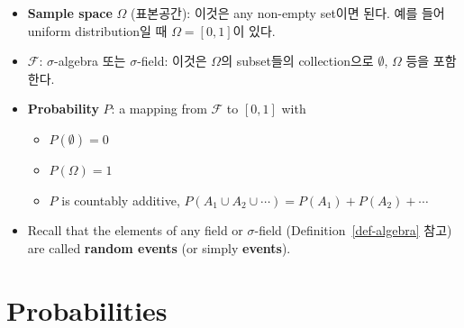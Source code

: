 \documentclass[
  13pt,
  letterpaper,
  DIV=11,
  numbers=noendperiod]{scrreprt}
\providecommand{\tightlist}{%
  \setlength{\itemsep}{0pt}\setlength{\parskip}{0pt}}\usepackage{longtable,booktabs,array}
\theoremstyle{plain}
\theoremstyle{definition}
\theoremstyle{definition}
\theoremstyle{plain}
\theoremstyle{definition}
\theoremstyle{plain}
\theoremstyle{remark}
\begin{document}
\begin{itemize}
\item
  \textbf{Sample space} \(\Omega\) (표본공간): 이것은 any non-empty
  set이면 된다. 예를 들어 uniform distribution일 때 \(\Omega = [0,1]\)이
  있다.
\item
  \(\mathcal{F}\): \(\sigma\)-algebra 또는 \(\sigma\)-field: 이것은
  \(\Omega\)의 subset들의 collection으로 \(\emptyset\), \(\Omega\) 등을
  포함한다.
\item
  \textbf{Probability} \(P\): a mapping from \(\mathcal{F}\) to
  \([0,1]\) with

  \begin{itemize}
  \tightlist
  \item
    \(P(\emptyset)=0\)
  \item
    \(P(\Omega)=1\)
  \item
    \(P\) is countably additive,
    \(P(A_1 \cup A_2 \cup \cdots) = P(A_1) + P(A_2) + \cdots\)
  \end{itemize}
\end{itemize}

\begin{itemize}
\tightlist
\item
  Recall that the elements of any field or \(\sigma\)-field
  (Definition~\ref{def-algebra} 참고) are called \textbf{random events}
  (or simply \textbf{events}).
\end{itemize}

\section{Probabilities}\label{probabilities}
\end{document}
